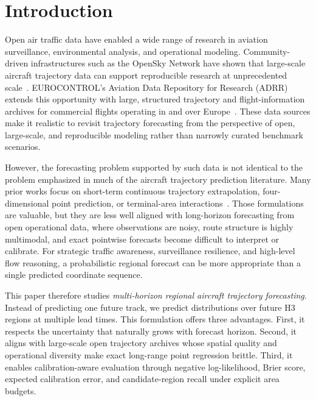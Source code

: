 \section{Introduction}

Open air traffic data have enabled a wide range of research in aviation surveillance, environmental analysis, and operational modeling. Community-driven infrastructures such as the OpenSky Network have shown that large-scale aircraft trajectory data can support reproducible research at unprecedented scale~\cite{opensky2014,strohmeier2021crowdsourced}. EUROCONTROL's Aviation Data Repository for Research (ADRR) extends this opportunity with large, structured trajectory and flight-information archives for commercial flights operating in and over Europe~\cite{eurocontrol_adrr_2025}. These data sources make it realistic to revisit trajectory forecasting from the perspective of open, large-scale, and reproducible modeling rather than narrowly curated benchmark scenarios.

However, the forecasting problem supported by such data is not identical to the problem emphasized in much of the aircraft trajectory prediction literature. Many prior works focus on short-term continuous trajectory extrapolation, four-dimensional point prediction, or terminal-area interactions~\cite{jia2022attentionlstm,ma2024attentiontcngru,li2025noiserobust,shan2025sparse}. Those formulations are valuable, but they are less well aligned with long-horizon forecasting from open operational data, where observations are noisy, route structure is highly multimodal, and exact pointwise forecasts become difficult to interpret or calibrate. For strategic traffic awareness, surveillance resilience, and high-level flow reasoning, a probabilistic regional forecast can be more appropriate than a single predicted coordinate sequence.

This paper therefore studies \emph{multi-horizon regional aircraft trajectory forecasting}. Instead of predicting one future track, we predict distributions over future H3 regions at multiple lead times. This formulation offers three advantages. First, it respects the uncertainty that naturally grows with forecast horizon. Second, it aligns with large-scale open trajectory archives whose spatial quality and operational diversity make exact long-range point regression brittle. Third, it enables calibration-aware evaluation through negative log-likelihood, Brier score, expected calibration error, and candidate-region recall under explicit area budgets.


